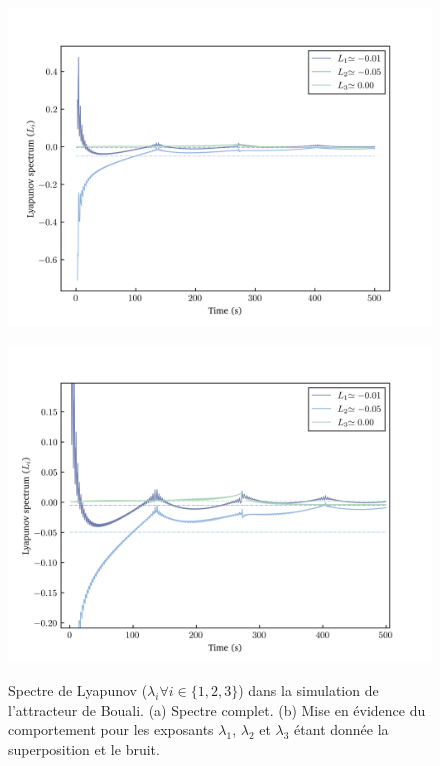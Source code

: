     \clearpage

    \begin{figure}[h!]
        \centering
        \begin{minipage}{0.49\textwidth}
          \centering
          \includegraphics[scale = 0.4]{figs/lyapunovs/lyap_bouali.png}
          \subcaption{}
          \label{fig: lyap_bouali}
        \end{minipage}
        \begin{minipage}{0.49\textwidth}
          \centering
          \includegraphics[scale = 0.4]{figs/lyapunovs/lyap_bouali_zoom.png}
          \subcaption{}
          \label{fig: lyap_bouali_zoom}
        \end{minipage}
        \caption{Spectre de Lyapunov ($\lambda_i\forall i\in\{1, 2, 3\}$) dans la simulation de l'attracteur de Bouali. (a) Spectre complet. (b) Mise en évidence du comportement pour les exposants $\lambda_1$, $\lambda_2$ et $\lambda_3$ étant donnée la superposition et le bruit.}
        \label{fig : lyaps_bouali}
    \end{figure}

\twocolumngrid
